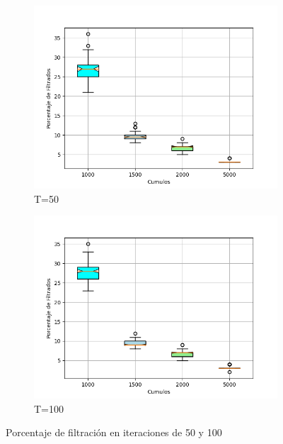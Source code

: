 \documentclass{article}
\begin{document}
\begin{figure}
       \centering
        \begin{subfigure}[b]{0.90\linewidth}
            \includegraphics[width=\linewidth]{cumulos50.png}
            \caption{T=50}	
            \label{f2.a}
        \end{subfigure}
\begin{subfigure}[b]{0.90\linewidth}
            \includegraphics[width=\linewidth]{cumulos1000.png}
            \caption{T=100}
            \label{f2.b}
        \end{subfigure}
\caption{Porcentaje de filtraci\'on en iteraciones de 50 y 100}
        \label{f2}
\end{figure}
\end{document}

